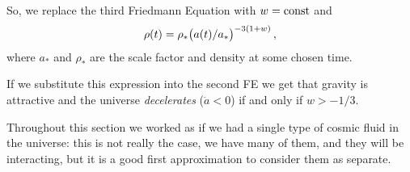\documentclass[main.tex]{subfiles}
\begin{document}








So, we replace the third Friedmann Equation with \(w = \text{const}\) and 
%
\begin{align}
  \rho(t) = \rho_{*} \qty(a(t) / a_{*})^{-3(1+w)} 
\,,
\end{align}
%
where \(a_{*}\) and \(\rho_{*} \) are the scale factor and density at some chosen time.

If we substitute this expression into the second FE we get that gravity is attractive and the universe \emph{decelerates} (\(\ddot{a} < 0 \)) if and only if \(w > -1/3\). 

Throughout this section we worked as if we had a single type of cosmic fluid in the universe: this is not really the case, we have many of them, and they will be interacting, but it is a good first approximation to consider them as separate.  
\end{document}
